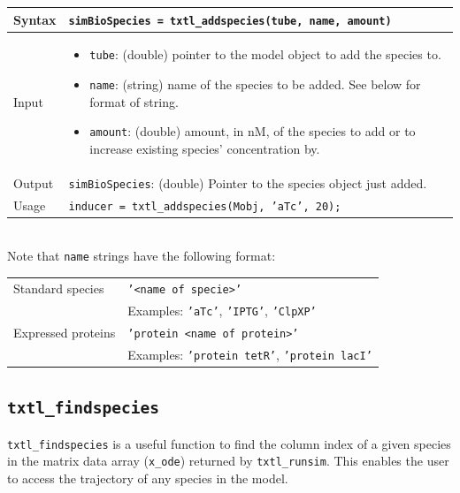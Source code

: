 \documentclass[english]{report}
\begin{document}
			\begin{tabular}{p{2cm}|p{13cm}}
			Syntax & \texttt{simBioSpecies = txtl\_addspecies(tube, name, amount)}\\ \hline
			Input &  \begin{itemize}
				\item \texttt{tube}: (double) pointer to the model object to add the species to.
				\item \texttt{name}: (string) name of the species to be added. See below for format of string.  
				\item \texttt{amount}: (double) amount, in nM, of the species to add or to increase existing species' concentration by. 
				\end{itemize} \\ \hline
			Output & \texttt{simBioSpecies}: (double) Pointer to the species object just added.\\ \hline
			Usage & \texttt{inducer = txtl\_addspecies(Mobj, 'aTc', 20);}\\
			\end{tabular} \\
			
			
			Note that \texttt{name} strings have the following format: \\
			
			\begin{tabular}{|p{2cm}|p{13cm}|}
			\hline
			Standard species & \texttt{'<name of specie>'}\\ 
			& Examples: \texttt{'aTc'},  \texttt{'IPTG'},  \texttt{'ClpXP'} \\ \hline
			Expressed proteins & \texttt{'protein <name of protein>'} \\
			& Examples: \texttt{'protein tetR'},  \texttt{'protein lacI'} \\ \hline
			\end{tabular}
					
					
		\subsection*{\texttt{txtl\_findspecies}}
			\texttt{txtl\_findspecies} is a useful function to find the column index of a given species in the matrix data array (\texttt{x\_ode}) returned by \texttt{txtl\_runsim}. This enables the user to access the trajectory of any species in the model. \\
			
\end{document}
